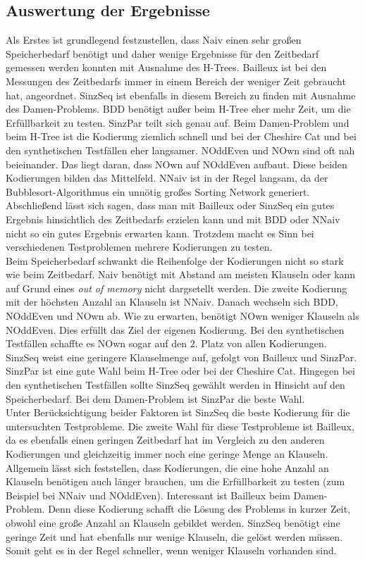 \documentclass[a4,abstract=on]{scrartcl}
\begin{document}
\subsection{Auswertung der Ergebnisse}
Als Erstes ist grundlegend festzustellen, dass Naiv einen sehr großen Speicherbedarf benötigt und daher wenige Ergebnisse für den Zeitbedarf gemessen werden konnten mit Ausnahme des H-Trees. Bailleux ist bei den Messungen des Zeitbedarfs immer in einem Bereich der weniger Zeit gebraucht hat, angeordnet. SinzSeq ist ebenfalls in diesem Bereich zu finden mit Ausnahme des Damen-Problems. BDD benötigt außer beim H-Tree eher mehr Zeit, um die Erfüllbarkeit zu testen. SinzPar teilt sich genau auf. Beim Damen-Problem und beim H-Tree ist die Kodierung ziemlich schnell und bei der Cheshire Cat und bei den synthetischen Testfällen eher langsamer. NOddEven und NOwn sind oft nah beieinander. Das liegt daran, dass NOwn auf NOddEven aufbaut. Diese beiden Kodierungen bilden das Mittelfeld. NNaiv ist in der Regel langsam, da der Bubblesort-Algorithmus ein unnötig großes Sorting Network generiert. Abschließend lässt sich sagen, dass man mit Bailleux oder SinzSeq ein gutes Ergebnis hinsichtlich des Zeitbedarfs erzielen kann und mit BDD oder NNaiv nicht so ein gutes Ergebnis erwarten kann. Trotzdem macht es Sinn bei verschiedenen Testproblemen mehrere Kodierungen zu testen.\\
Beim Speicherbedarf schwankt die Reihenfolge der Kodierungen nicht so stark wie beim Zeitbedarf. Naiv benötigt mit Abstand am meisten Klauseln oder kann auf Grund eines \textit{out of memory} nicht dargsetellt werden. Die zweite Kodierung mit der höchsten Anzahl an Klauseln ist NNaiv. Danach wechseln sich BDD, NOddEven und NOwn ab. Wie zu erwarten, benötigt NOwn weniger Klauseln als NOddEven. Dies erfüllt das Ziel der eigenen Kodierung. Bei den synthetischen Testfällen schaffte es NOwn sogar auf den $2.$ Platz von allen Kodierungen.\\
SinzSeq weist eine geringere Klauselmenge auf, gefolgt von Bailleux und SinzPar. SinzPar ist eine gute Wahl beim H-Tree oder bei der Cheshire Cat. Hingegen bei den synthetischen Testfällen sollte SinzSeq gewählt werden in Hinsicht auf den Speicherbedarf. Bei dem Damen-Problem ist SinzPar die beste Wahl. \\
Unter Berücksichtigung beider Faktoren ist SinzSeq die beste Kodierung für die untersuchten Testprobleme. Die zweite Wahl für diese Testprobleme ist Bailleux, da es ebenfalls einen geringen Zeitbedarf hat im Vergleich zu den anderen Kodierungen und gleichzeitig immer noch eine geringe Menge an Klauseln.\\
Allgemein lässt sich feststellen, dass Kodierungen, die eine hohe Anzahl an Klauseln benötigen auch länger brauchen, um die Erfüllbarkeit zu testen (zum Beispiel bei NNaiv und NOddEven). Interessant ist Bailleux beim Damen-Problem. Denn diese Kodierung schafft die Lösung des Problems in kurzer Zeit, obwohl eine große Anzahl an Klauseln gebildet werden. SinzSeq benötigt eine geringe Zeit und hat ebenfalls nur wenige Klauseln, die gelöst werden müssen. Somit geht es in der Regel schneller, wenn weniger Klauseln vorhanden sind.
\end{document}
